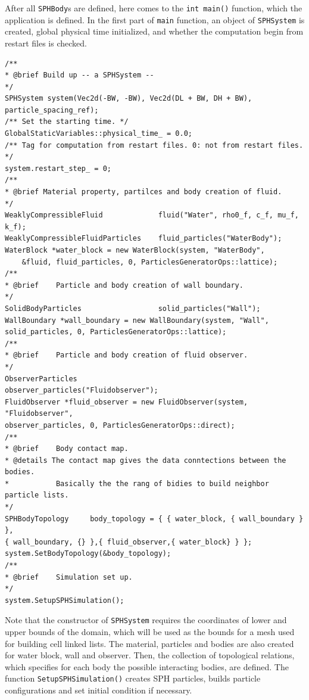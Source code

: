 \documentclass[12pt, a4paper,onecolumn]{article}
\begin{document}
After all \texttt{SPHBody}s are defined, here comes to the \texttt{int main()} function,
which the application is defined.
In the first part of \texttt{main} function, 
an object of \texttt{SPHSystem} is created, global physical time initialized,
and whether the computation begin from restart files is checked.
%
\begin{lstlisting}[basicstyle=\ttfamily\footnotesize]
/**
* @brief Build up -- a SPHSystem --
*/
SPHSystem system(Vec2d(-BW, -BW), Vec2d(DL + BW, DH + BW), particle_spacing_ref);
/** Set the starting time. */
GlobalStaticVariables::physical_time_ = 0.0;
/** Tag for computation from restart files. 0: not from restart files. */
system.restart_step_ = 0;
/**
* @brief Material property, partilces and body creation of fluid.
*/
WeaklyCompressibleFluid 			fluid("Water", rho0_f, c_f, mu_f, k_f);
WeaklyCompressibleFluidParticles 	fluid_particles("WaterBody");
WaterBlock *water_block = new WaterBlock(system, "WaterBody", 
	&fluid, fluid_particles, 0, ParticlesGeneratorOps::lattice);
/**
* @brief 	Particle and body creation of wall boundary.
*/
SolidBodyParticles 					solid_particles("Wall");
WallBoundary *wall_boundary = new WallBoundary(system, "Wall",
solid_particles, 0, ParticlesGeneratorOps::lattice);
/**
* @brief 	Particle and body creation of fluid observer.
*/
ObserverParticles 					observer_particles("Fluidobserver");
FluidObserver *fluid_observer = new FluidObserver(system, "Fluidobserver",
observer_particles, 0, ParticlesGeneratorOps::direct);
/**
* @brief 	Body contact map.
* @details The contact map gives the data conntections between the bodies.
* 			Basically the the rang of bidies to build neighbor particle lists.
*/
SPHBodyTopology 	body_topology = { { water_block, { wall_boundary } },
{ wall_boundary, {} },{ fluid_observer,{ water_block} } };
system.SetBodyTopology(&body_topology);
/**
* @brief 	Simulation set up.
*/
system.SetupSPHSimulation();
\end{lstlisting}
%
Note that the constructor of \texttt{SPHSystem} requires the coordinates of 
lower and upper bounds of the domain, which will be used as the bounds 
for a mesh used for building cell linked lists.
The material, particles and bodies are also created for water block, wall and observer. 
Then, the collection of topological relations,
which specifies for each body the possible interacting bodies, 
are defined. The function \texttt{SetupSPHSimulation()} creates SPH particles,
builds particle configurations and set initial condition if necessary.
\end{document}
